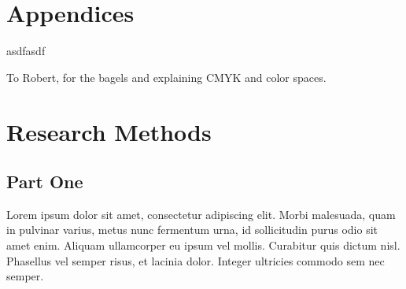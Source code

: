 \documentclass[manuscript,nonacm]{acmart}
\begin{document}
\section{Appendices}

asdfasdf

\begin{acks}
To Robert, for the bagels and explaining CMYK and color spaces.
\end{acks}




\appendix
\section{Research Methods}

\subsection{Part One}

Lorem ipsum dolor sit amet, consectetur adipiscing elit. Morbi
malesuada, quam in pulvinar varius, metus nunc fermentum urna, id
sollicitudin purus odio sit amet enim. Aliquam ullamcorper eu ipsum
vel mollis. Curabitur quis dictum nisl. Phasellus vel semper risus, et
lacinia dolor. Integer ultricies commodo sem nec semper.
\end{document}
